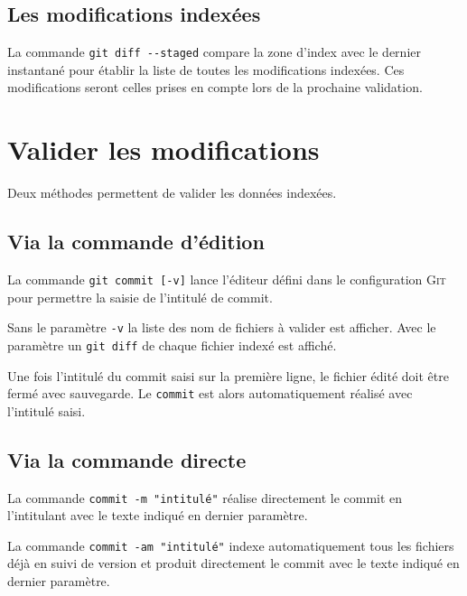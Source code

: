 \documentclass[11pt,twoside,headings=normal,open=right,french,DIV=12]{scrreprt}
\newcommand{\git}{\textsc{Git}}
\begin{document}
\subsection{Les modifications indexées}



    La commande \verb|git diff --staged| compare la zone d'index avec le dernier instantané pour établir la liste de toutes
    les modifications indexées. Ces modifications seront celles prises en compte lors de la prochaine validation.



\section{Valider les modifications}



    Deux méthodes permettent de valider les données indexées.



\subsection{Via la commande d'édition}    
\label{subsec-valider_commit}


    La commande \verb|git commit [-v]| lance l'éditeur défini dans le configuration \git{} pour permettre la saisie de l'intitulé de commit.
    
    Sans le paramètre \verb|-v| la liste des nom de fichiers à valider est afficher. Avec le paramètre un \verb|git diff| de chaque fichier indexé est affiché.
    
    \smallskip
    
    Une fois l'intitulé du commit saisi sur la première ligne, le fichier édité doit être fermé avec sauvegarde. Le
    \verb|commit| est alors automatiquement réalisé avec l'intitulé saisi.



\subsection{Via la commande directe}    



    La commande \verb|commit -m "intitulé"| réalise directement le commit en l'intitulant avec le texte indiqué en dernier paramètre.

    \smallskip
    
    La commande \verb|commit -am "intitulé"| indexe automatiquement tous les fichiers déjà en suivi de version et produit directement le commit avec le texte indiqué en dernier paramètre.
\end{document}
